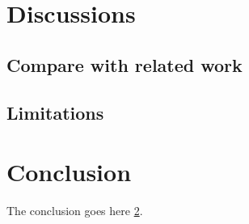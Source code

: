 \documentclass[10pt,journal,compsoc]{IEEEtran}
\begin{document}
%




\section{Discussions}
\subsection{Compare with related work}

\subsection{Limitations}

\section{Conclusion}\label{ch:first}
The conclusion goes here \ref{ch:first}.
\end{document}
